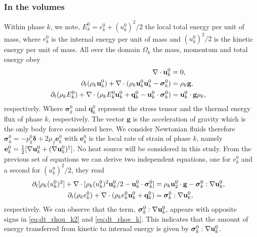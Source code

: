 \subsubsection{In the volumes}
Within phase $k$, we note, $E_k^0 = e_k^0 + (u_k^0)^2/2$ the local total energy per unit of mass, where $e_k^0$ is the internal energy per unit of mass and $(u_k^0)^2/2$ is the kinetic energy per unit of mass.
All over the domain $\Omega_k$ the mass, momentum and total energy obey 
\begin{align}
    \label{eq:dt_rho}
    \mathbf{\nabla}\cdot \textbf{u}_k^0
    &= 
    0,\\
    \label{eq:dt_rhou_k}
    \partial_t (\rho_k\textbf{u}_k^0)  
    + \mathbf{\nabla}\cdot (
        \rho_k\textbf{u}_k^0\textbf{u}_k^0
        - \bm{\sigma}_k^0 
    )
    &= 
    \rho_k \textbf{g},\\
    \label{eq:dt_rhoE_k}
    \partial_t (\rho_kE_k^0)  
    + \mathbf{\nabla}\cdot (
        \rho_kE_k^0\textbf{u}_k^0
        + \textbf{q}_k^0
        - \textbf{u}_k^0 \cdot \bm{\sigma}_k^0 
        )
    &= 
    \textbf{u}_k^0 \cdot \textbf{g}  \rho_k, 
\end{align} 
respectively. 
Where $\bm\sigma_k^0$ and $\textbf{q}_k^0$ represent the stress tensor and the thermal energy flux of phase $k$, respectively. 
The vector $\textbf{g}$ is the acceleration of gravity which is the only body force considered here.
We consider Newtonian fluids therefore $\bm\sigma_k^0 = -p_k^0\bm\delta + 2\mu_f \textbf{e}_k^0$ with $\textbf{e}_k^0$ is the local rate of strain of phase $k$, namely $\textbf{e}_k^0 = \frac{1}{2}[\mathbf{\nabla} \textbf{u}_k^0 + (\mathbf{\nabla} \textbf{u}_k^0)^\dagger]$. 
No heat source will be considered in this study. 
From the previous set of equations we can derive two independent equations, one for $e_k^0$ and a second for $(u_k^0)^2/2$, they read
\begin{align}
    \label{eq:dt_rhou_k2}
    \partial_t [\rho_k(u_k^0)^2]  
    + \mathbf{\nabla}\cdot [\rho_k(u_k^0)^2\textbf{u}_k^0/2 - \textbf{u}_k^0 \cdot \bm{\sigma}_k^0]
    &=
    \rho_k\textbf{u}_2^0 \cdot \textbf{g}  
    -  \bm{\sigma}_k^0 : \mathbf{\nabla} \textbf{u}_k^0,
    \\
    \label{eq:dt_rhoe_k}
    \partial_t (\rho_ke_k^0)  
    + \mathbf{\nabla}\cdot (
        \rho_ke_k^0\textbf{u}_k^0
        + \textbf{q}_k^0
        )
    &= 
    \bm{\sigma}_k^0 : \mathbf{\nabla} \textbf{u}_k^0,
\end{align} 
respectively. 
We can observe that the term, $\bm{\sigma}_k^0 : \mathbf{\nabla} \textbf{u}_k^0$,  appears with opposite signs in \ref{eq:dt_rhou_k2} and \ref{eq:dt_rhoe_k}.
This indicates that the amount of energy transferred from kinetic to internal energy is given by $\bm{\sigma}_k^0 : \mathbf{\nabla} \textbf{u}_k^0$.

